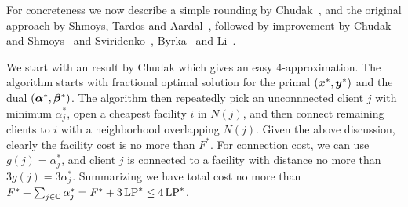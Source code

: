 \documentclass[oneside,final]{ucr}
\begin{document}
For concreteness we now describe a simple rounding by
Chudak~\cite{Chudak98}, and the original approach by Shmoys,
Tardos and Aardal~\cite{ShmoysTA97}, followed by improvement
by Chudak and Shmoys~\cite{ChudakS04} and
Sviridenko~\cite{Svi02}, Byrka~\cite{Byrka07} and
Li~\cite{Li11}.

We start with an result by Chudak which gives an easy
$4$-approximation. The algorithm starts with fractional
optimal solution for the primal $(\boldsymbol{x}^\ast,\boldsymbol{y}^\ast)$ and
the dual $(\boldsymbol{\alpha}^\ast, \boldsymbol{\beta}^\ast)$. The algorithm then
repeatedly pick an unconnnected client $j$ with minimum
$\alpha_j^\ast$, open a cheapest facility $i$ in $N(j)$, and
then connect remaining clients to $i$ with a neighborhood
overlapping $N(j)$. Given the above discussion, clearly the
facility cost is no more than $F^\ast$. For connection cost,
we can use $g(j) = \alpha_j^\ast$, and client $j$ is
connected to a facility with distance no more than $3 g(j) =
3 \alpha_j^\ast$. Summarizing we have total cost no more
than $F^\ast + \sum_{j\in\mathbb{C}} \alpha_j^\ast = F^\ast
+ 3\,\mbox{\rm LP}^\ast \leq 4\,\mbox{\rm LP}^\ast$.
\end{document}
